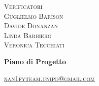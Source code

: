 \documentclass[8pt]{article}
\begin{document}
\begin{titlepage}
\begin{minipage}[t]{0.47\textwidth}
		{\large{\textsc{Verificatori}}
			\vspace{3mm}
			{\\\large{\textsc{Guglielmo Barison}\\}}
			{\large{\textsc{Davide Donanzan}\\}}
   {\large{\textsc{Linda Barbiero}\\}}
      {\large{\textsc{Veronica Tecchiati}\\}}
		}
		\vspace{4mm}\vspace{4mm}
	\end{minipage}
	\vspace{4cm}
	\begin{center}
		\begin{flushright}
			{\fontsize{30pt}{52pt}\selectfont \textbf{Piano di Progetto\\}} %
		\end{flushright}
		\vspace{2cm}
	\end{center}
	\vspace{7.5cm}
	{\small \textsc{\href{mailto: nan1fyteam.unipd@gmail.com}{\color{black}nan1fyteam.unipd@gmail.com}}}
\end{titlepage}
\pagestyle{mystyle}
\end{document}

